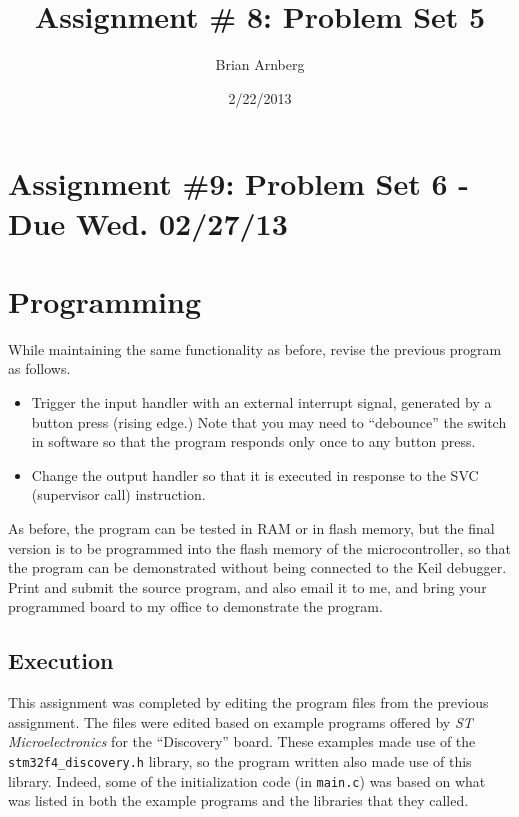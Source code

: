 \documentclass{article}
\title{Assignment \# 8: Problem Set 5}
\date{2/22/2013}
\author{Brian Arnberg}
\begin{document}
\label{start}



\section*{Assignment \#9: Problem Set 6 - Due Wed. 02/27/13}
\section{Programming}
While maintaining the same functionality as before, revise the previous program as follows.
\begin{itemize}
	\item Trigger the input handler with an external interrupt signal, generated by a button
           press (rising edge.) Note that you may need to ``debounce'' the switch in software so
           that the program responds only once to any button press.
	\item Change the output handler so that it is executed in response to the SVC (supervisor
           call) instruction.
\end{itemize}
   As before, the program can be tested in RAM or in flash memory, but the final version is to
   be programmed into the flash memory of the microcontroller, so that the program can be
   demonstrated without being connected to the Keil debugger.
   Print and submit the source program, and also email it to me, and bring your programmed
   board to my office to demonstrate the program.



\subsection{Execution}
This assignment was completed by editing the program files from the previous assignment. The files were edited based on example programs offered by \emph{ST Microelectronics} for the ``Discovery'' board. These examples made use of the \texttt{stm32f4\_discovery.h} library, so the program written also made use of this library. Indeed, some of the initialization code (in \texttt{main.c}) was based on what was listed in both the example programs and the libraries that they called.\\
\end{document}
